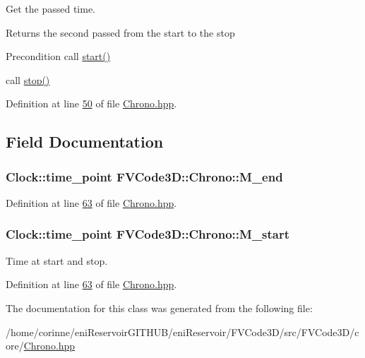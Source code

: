 Get the passed time. 

\begin{DoxyReturn}{Returns}
the second passed from the start to the stop 
\end{DoxyReturn}
\begin{DoxyPrecond}{Precondition}
call \hyperlink{classFVCode3D_1_1Chrono_a13f2f4fa4096ec9eafa7ad59fea3df87}{start()} 

call \hyperlink{classFVCode3D_1_1Chrono_acc8f31330aa1819b12947866075fbc9e}{stop()} 
\end{DoxyPrecond}


Definition at line \hyperlink{Chrono_8hpp_source_l00050}{50} of file \hyperlink{Chrono_8hpp_source}{Chrono.\+hpp}.



\subsection{Field Documentation}
\subsubsection[{\texorpdfstring{M\+\_\+end}{M_end}}]{\setlength{\rightskip}{0pt plus 5cm}Clock\+::time\+\_\+point F\+V\+Code3\+D\+::\+Chrono\+::\+M\+\_\+end\hspace{0.3cm}{\ttfamily [private]}}\hypertarget{classFVCode3D_1_1Chrono_a4ba4c5c8b4393d2484a169c631977e40}{}\label{classFVCode3D_1_1Chrono_a4ba4c5c8b4393d2484a169c631977e40}


Definition at line \hyperlink{Chrono_8hpp_source_l00063}{63} of file \hyperlink{Chrono_8hpp_source}{Chrono.\+hpp}.

\subsubsection[{\texorpdfstring{M\+\_\+start}{M_start}}]{\setlength{\rightskip}{0pt plus 5cm}Clock\+::time\+\_\+point F\+V\+Code3\+D\+::\+Chrono\+::\+M\+\_\+start\hspace{0.3cm}{\ttfamily [private]}}\hypertarget{classFVCode3D_1_1Chrono_aed2f31857e3d6f7ef71e2e36832f3286}{}\label{classFVCode3D_1_1Chrono_aed2f31857e3d6f7ef71e2e36832f3286}


Time at start and stop. 



Definition at line \hyperlink{Chrono_8hpp_source_l00063}{63} of file \hyperlink{Chrono_8hpp_source}{Chrono.\+hpp}.



The documentation for this class was generated from the following file\+:\begin{DoxyCompactItemize}
\item 
/home/corinne/eni\+Reservoir\+G\+I\+T\+H\+U\+B/eni\+Reservoir/\+F\+V\+Code3\+D/src/\+F\+V\+Code3\+D/core/\hyperlink{Chrono_8hpp}{Chrono.\+hpp}\end{DoxyCompactItemize}
